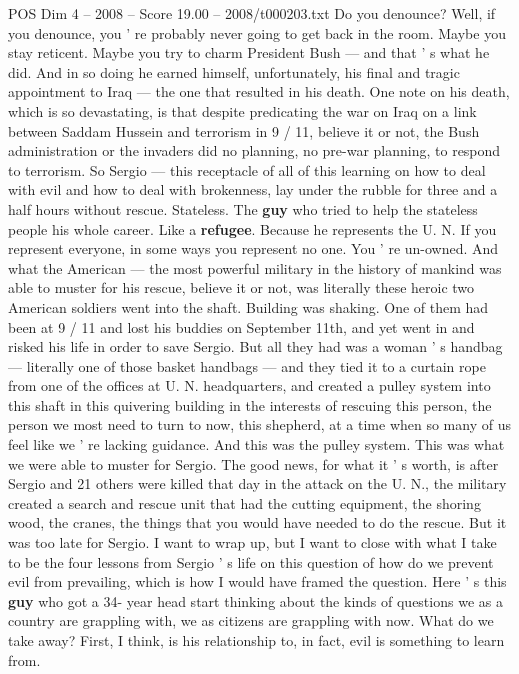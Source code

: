 \begin{textsample}{POS Dim 4 – 2008 – Score 19.00 – 2008/t000203.txt}
Do you denounce?
Well, if you denounce, you ' re probably never going to get back in the room.
Maybe you stay reticent.
Maybe you try to charm President Bush — and that ' s what he did.
And in so doing he earned himself, unfortunately, his final and tragic appointment to Iraq — the one that resulted in his death.
One note on his death, which is so devastating, is that despite predicating the war on Iraq on a link between Saddam Hussein and terrorism in 9 / 11, believe it or not, the Bush administration or the invaders did no planning, no pre-war planning, to respond to terrorism.
So Sergio — this receptacle of all of this learning on how to deal with evil and how to deal with brokenness, lay under the rubble for three and a half hours without rescue.
Stateless.
The \textbf{guy} who tried to help the stateless people his whole career.
Like a \textbf{refugee}.
Because he represents the U.
N.
If you represent everyone, in some ways you represent no one.
You ' re un-owned.
And what the American — the most powerful military in the history of mankind was able to muster for his rescue, believe it or not, was literally these heroic two American soldiers went into the shaft.
Building was shaking.
One of them had been at 9 / 11 and lost his buddies on September 11th, and yet went in and risked his life in order to save Sergio.
But all they had was a woman ' s handbag — literally one of those basket handbags — and they tied it to a curtain rope from one of the offices at U.
N. headquarters, and created a pulley system into this shaft in this quivering building in the interests of rescuing this person, the person we most need to turn to now, this shepherd, at a time when so many of us feel like we ' re lacking guidance.
And this was the pulley system.
This was what we were able to muster for Sergio.
The good news, for what it ' s worth, is after Sergio and 21 others were killed that day in the attack on the U.
N., the military created a search and rescue unit that had the cutting equipment, the shoring wood, the cranes, the things that you would have needed to do the rescue.
But it was too late for Sergio.
I want to wrap up, but I want to close with what I take to be the four lessons from Sergio ' s life on this question of how do we prevent evil from prevailing, which is how I would have framed the question.
Here ' s this \textbf{guy} who got a 34- year head start thinking about the kinds of questions we as a country are grappling with, we as citizens are grappling with now.
What do we take away?
First, I think, is his relationship to, in fact, evil is something to learn from.

\end{textsample}
